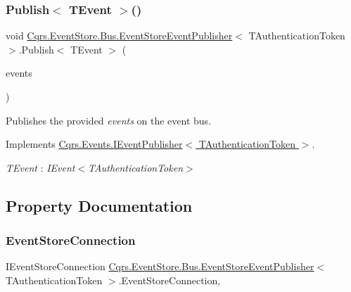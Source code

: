\subsubsection{\texorpdfstring{Publish$<$ T\+Event $>$()}{Publish< TEvent >()}\hspace{0.1cm}{\footnotesize\ttfamily [2/2]}}
{\footnotesize\ttfamily void \hyperlink{classCqrs_1_1EventStore_1_1Bus_1_1EventStoreEventPublisher}{Cqrs.\+Event\+Store.\+Bus.\+Event\+Store\+Event\+Publisher}$<$ T\+Authentication\+Token $>$.Publish$<$ T\+Event $>$ (\begin{DoxyParamCaption}\item[{I\+Enumerable$<$ T\+Event $>$}]{events }\end{DoxyParamCaption})}



Publishes the provided {\itshape events}  on the event bus. 



Implements \hyperlink{interfaceCqrs_1_1Events_1_1IEventPublisher_a2cbcc3d2c24d015abef6337714ec51ff_a2cbcc3d2c24d015abef6337714ec51ff}{Cqrs.\+Events.\+I\+Event\+Publisher$<$ T\+Authentication\+Token $>$}.

\begin{Desc}
\item[Type Constraints]\begin{description}
\item[{\em T\+Event} : {\em I\+Event$<$T\+Authentication\+Token$>$}]\end{description}
\end{Desc}


\subsection{Property Documentation}
\mbox{\label{classCqrs_1_1EventStore_1_1Bus_1_1EventStoreEventPublisher_a16df48a7203bc3bcde5f5a12f1d47934_a16df48a7203bc3bcde5f5a12f1d47934}} 
\subsubsection{\texorpdfstring{Event\+Store\+Connection}{EventStoreConnection}}
{\footnotesize\ttfamily I\+Event\+Store\+Connection \hyperlink{classCqrs_1_1EventStore_1_1Bus_1_1EventStoreEventPublisher}{Cqrs.\+Event\+Store.\+Bus.\+Event\+Store\+Event\+Publisher}$<$ T\+Authentication\+Token $>$.Event\+Store\+Connection\hspace{0.3cm}{\ttfamily [get]}, {\ttfamily [protected]}}

